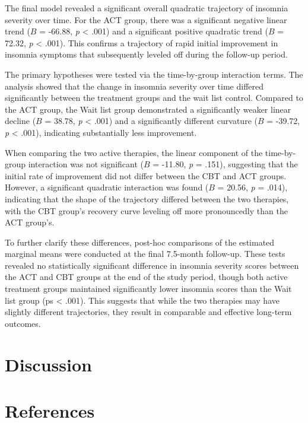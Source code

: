 \documentclass[
  english,
  man]{apa6}
\begin{document}
The final model revealed a significant overall quadratic trajectory of insomnia severity over time. For the ACT group, there was a significant negative linear trend (\(B\) = -66.88, \emph{p} \textless{} .001) and a significant positive quadratic trend (\(B\) = 72.32, \emph{p} \textless{} .001). This confirms a trajectory of rapid initial improvement in insomnia symptoms that subsequently leveled off during the follow-up period.

The primary hypotheses were tested via the time-by-group interaction terms. The analysis showed that the change in insomnia severity over time differed significantly between the treatment groups and the wait list control. Compared to the ACT group, the Wait list group demonstrated a significantly weaker linear decline (\(B\) = 38.78, \emph{p} \textless{} .001) and a significantly different curvature (\(B\) = -39.72, \emph{p} \textless{} .001), indicating substantially less improvement.

When comparing the two active therapies, the linear component of the time-by-group interaction was not significant (\(B\) = -11.80, \emph{p} = .151), suggesting that the initial rate of improvement did not differ between the CBT and ACT groups. However, a significant quadratic interaction was found (\(B\) = 20.56, \emph{p} = .014), indicating that the shape of the trajectory differed between the two therapies, with the CBT group's recovery curve leveling off more pronouncedly than the ACT group's.

To further clarify these differences, post-hoc comparisons of the estimated marginal means were conducted at the final 7.5-month follow-up. These tests revealed no statistically significant difference in insomnia severity scores between the ACT and CBT groups at the end of the study period, though both active treatment groups maintained significantly lower insomnia scores than the Wait list group (ps \textless{} .001). This suggests that while the two therapies may have slightly different trajectories, they result in comparable and effective long-term outcomes.

\section{Discussion}\label{discussion}

\newpage

\section{References}\label{references}

\label{refs}
\end{document}

